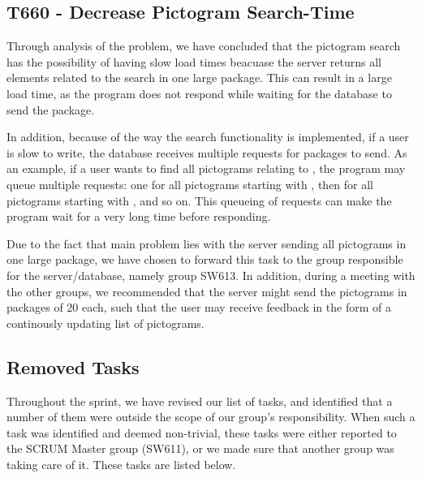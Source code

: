\subsection{T660 - Decrease Pictogram Search-Time}
Through analysis of the problem, we have concluded that the pictogram search has
the possibility of having slow load times beacuase the server returns all
elements related to the search in one large package. This can result in a large
load time, as the program does not respond while waiting for the database to
send the package. \nl

In addition, because of the way the search functionality is
implemented, if a user is slow to write, the database receives multiple requests
for packages to send. As an example, if a user wants to find all pictograms
relating to , the program may queue multiple requests: one for
all pictograms starting with , then for all pictograms starting with
, and so on. This queueing of requests can make the program wait for a
very long time before responding.\nl

Due to the fact that main problem lies with the server sending all pictograms in
one large package, we have chosen to forward this task to the group responsible
for the server/database, namely group SW613. In addition, during a meeting with
the other groups, we recommended that the server might send the pictograms in
packages of 20 each, such that the user may receive feedback in the form of a
continously updating list of pictograms.
 
\subsection{Removed Tasks}
Throughout the sprint, we have revised our list of tasks, and identified
that a number of them were outside the scope of our group's responsibility.
When such a task was identified and deemed non-trivial, these tasks were either
reported to the SCRUM Master group (SW611), or we made sure that another group
was taking care of it. These tasks are listed below.

